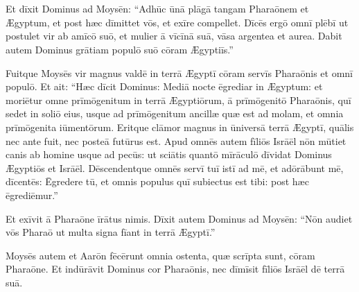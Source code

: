 \chapter{}


\thispagestyle{empty}

Et dīxit Dominus ad Moysēn: ``Adhūc ūnā
plāgā tangam Pharaōnem et Ægyptum, et post
hæc dīmittet vōs, et exīre compellet. Dīcēs ergō omnī
plēbī ut postulet vir ab amīcō suō, et mulier ā
vīcīnā suā, vāsa argentea et aurea. Dabit autem Dominus
grātiam populō suō cōram Ægyptiīs.''

Fuitque Moysēs vir
magnus valdē in terrā Ægyptī cōram servīs Pharaōnis et omnī
populō. Et ait: ``Hæc dīcit Dominus: Mediā nocte ēgrediar in Ægyptum: 
et moriētur omne prīmōgenitum in terrā Ægyptiōrum, ā
prīmōgenitō Pharaōnis, quī sedet in soliō eius, usque ad
prīmōgenitum ancillæ quæ est ad molam, et omnia
prīmōgenita iūmentōrum. Eritque clāmor magnus
in ūniversā terrā Ægyptī, quālis nec ante fuit, nec posteā futūrus est. 
Apud omnēs autem fīliōs Isrāēl nōn mūtiet
canis ab homine usque ad pecūs: ut sciātis quantō mīrāculō
dīvidat Dominus Ægyptiōs et Isrāēl. Dēscendentque omnēs servī tuī istī ad
mē, et adōrābunt mē, dīcentēs: Ēgredere tū, et omnis populus quī
subiectus est tibi: post
hæc ēgrediēmur.''

Et exīvit ā Pharaōne īrātus nimis. Dīxit
autem Dominus ad Moysēn: ``Nōn audiet vōs Pharaō ut multa
signa fīant in terrā Ægyptī.''

Moysēs autem et Aarōn fēcērunt omnia
ostenta, quæ scrīpta sunt, cōram Pharaōne. Et indūrāvit Dominus cor Pharaōnis, nec dīmīsit fīliōs Isrāēl dē terrā
suā. 
